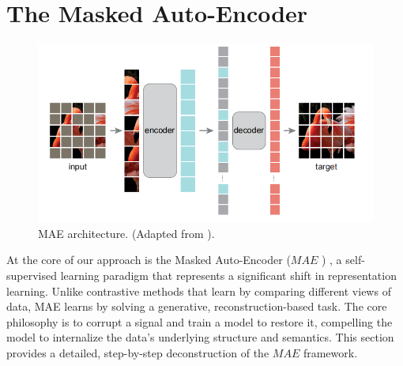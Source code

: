 \section{The Masked Auto-Encoder}
\label{section:mae_original}
\begin{figure}[H] 
    \centering
         \includegraphics[width=0.8\linewidth]{img_pfe/mae_original.PNG}
   
    
        \caption{MAE architecture. (Adapted from \parencite{maskedautoencoder}).}
        \label{fig:mae_original}
\end{figure}
At the core of our approach is the Masked Auto-Encoder (${MAE}$ )  \parencite{maskedautoencoder}, a self-supervised learning paradigm that represents a significant shift in representation learning. Unlike contrastive methods that learn by comparing different views of data, MAE learns by solving a generative, reconstruction-based task. The core philosophy is to corrupt a signal and train a model to restore it, compelling the model to internalize the data's underlying structure and semantics. This section provides a detailed, step-by-step deconstruction of the ${MAE}$  framework.

